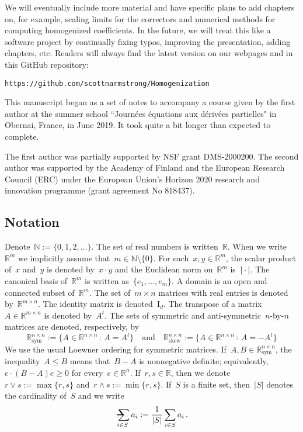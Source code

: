 \documentclass[11pt,twoside]{article} %
\makeatletter
\numberwithin{equation}{section}
\theoremstyle{definition}
\let\originalleft\left
\let\originalright\right
\renewcommand{\left}{\mathopen{}\mathclose\bgroup\originalleft}
\renewcommand{\right}{\aftergroup\egroup\originalright}
\newcommand*{\Id}{\ensuremath{\mathrm{I}_d}}
\newcommand*{\N}{\ensuremath{\mathbb{N}}}
\newcommand*{\R}{\ensuremath{\mathbb{R}}}
\newcommand{\avsum}{\mathop{\mathpalette\avsuminner\relax}\displaylimits}
\newcommand\avsuminner[2]{%
  {\sbox0{$\m@th#1\sum$}%
   \vphantom{\usebox0}%
   \ooalign{%
     \hidewidth
     \smash{\,\rule[.23em]{8.8pt}{1.1pt} \relax}%
     \hidewidth\cr
   ~$\m@th#1\sum$\cr
   }%
  }%
}
\makeatother
\begin{document}
\smallskip

We will eventually include more material and have specific plans to add chapters on, for example, scaling limits for the correctors and numerical methods for computing homogenized coefficients. In the future, we will treat this like a software project by continually fixing typos, improving the presentation, adding chapters, etc. Readers will always find the latest version on our webpages and in this GitHub repository:
\begin{center}
{\tt https://github.com/scottnarmstrong/Homogenization}
\end{center}

\smallskip


This manuscript began as a set of notes to accompany a course given by the first author at the summer school ``Journ\'ees \'equations aux d\'eriv\'ees partielles" in Obernai, France, in June 2019. It took quite a bit longer than expected to complete. 

\smallskip

The first author was partially supported by NSF grant DMS-2000200. The second author was supported by the Academy of Finland and the European Research Council (ERC) under the European Union's Horizon 2020 research and innovation programme (grant agreement No 818437).


\subsection*{Notation}

Denote~$\N:=\{0,1,2,\ldots\}$. The set of real numbers is written~$\R$. When we write~$\R^m$ we implicitly assume that~$m\in\N\setminus\{0\}$. For each~$x,y\in\R^m$, the scalar product of~$x$ and~$y$ is denoted by~$x\cdot y$ and the Euclidean norm on~$\R^m$ is~$\left| \,\cdot\, \right|$. The canonical basis of~$\R^m$ is written as~$\{e_1,\ldots,e_m\}$. A domain is an open and connected subset of~$\R^m$.  The set of~$m\times n$ matrices with real entries is denoted by~$\R^{m\times n}$. The identity matrix is denoted~$\Id$. The transpose of a matrix~$A \in \R^{m\times n}$ is denoted by~$A^t$. The sets of symmetric and anti-symmetric~$n$-by-$n$ matrices are denoted, respectively, by
\begin{equation}
\R_{\mathrm{sym}}^{n \times n} := \{ A \in \R^{n\times n} \,:\, A = A^t\}
\quad \mbox{and} \quad 
\R_{\mathrm{skew}}^{n \times n} := \{ A \in \R^{n\times n} \,:\, A = - A^t\}
\end{equation}
We use the usual Loewner ordering for symmetric matrices. If~$A,B\in \R_{\mathrm{sym}}^{n \times n}$, the inequality~$A \leq B$ means that~$B-A$ is nonnegative definite; equivalently,~$e \cdot (B-A)e \geq 0$ for every~$e\in\R^n$. 
If~$r,s\in \R$, then we denote~$r\vee s := \max\{ r,s \}$ and~$r\wedge s := \min\{r,s\}$. If~$S$ is a finite set, then~$|S|$ denotes the cardinality of~$S$ and we write
\begin{equation}
\label{e.slashedsum}
\avsum_{i \in S} a_i := \frac{1}{|S|} \sum_{i\in S} a_i 
\,.
\end{equation}
\end{document}
